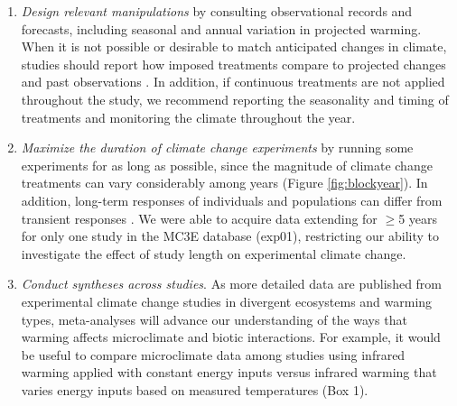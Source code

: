 \documentclass{article}
\begin{document}
\begin{enumerate}
\item\textit{Design relevant manipulations} by consulting observational records and forecasts, including seasonal and annual variation in projected warming. When it is not possible or desirable to match anticipated changes in climate, studies should report how imposed treatments compare to projected changes and past observations \citep[e.g.,][]{hoover2014, zhu2016}. In addition, if continuous treatments are not applied throughout the study, we recommend reporting the seasonality and timing of treatments and monitoring the climate throughout the year.

\item\textit{Maximize the duration of climate change experiments} by running some experiments for as long as possible, since the magnitude of climate change treatments can vary considerably among years (Figure \ref{fig:blockyear}). In addition, long-term responses of individuals and populations can differ from transient responses \citep{saleska2002,franklin1989,giasson2013,harte2015}. We were able to acquire data extending for $\geq$5 years for only one study in the MC3E database (exp01), restricting our ability to investigate the effect of study length on experimental climate change. %
\item\textit{Conduct syntheses across studies}. As more detailed data are published from experimental climate change studies in divergent ecosystems and warming types, meta-analyses will advance our understanding of the ways that warming affects microclimate and biotic interactions. For example, it would be useful to compare microclimate data among studies using infrared warming applied with constant energy inputs versus infrared warming that varies energy inputs based on measured temperatures (Box 1). 

\end{enumerate}



\end{document}
